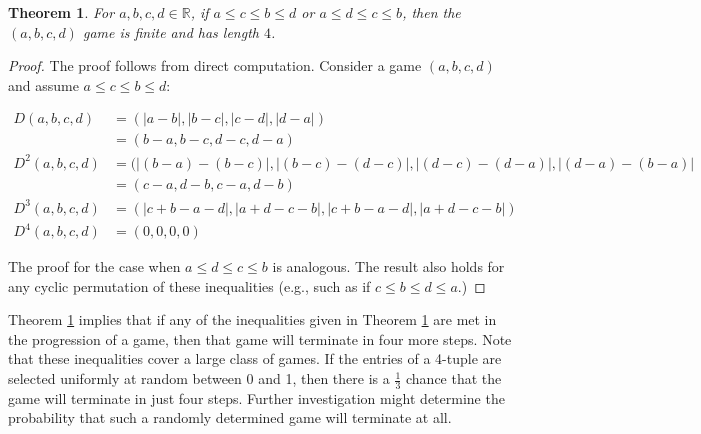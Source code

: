 \documentclass[12pt]{amsart}
\newtheorem{theorem}{Theorem}[section]
\newcommand{\diff}{D}
\begin{document}
\begin{theorem}
\label{thm:inequalities}
For $a,b,c,d\in \mathbb{R}$, if $a \leq c \leq b \leq d$ or $a \leq d \leq c \leq b$, then the $(a,b,c,d)$ game is finite and has length $4$. 
\end{theorem}

\begin{proof}

The proof follows from direct computation. Consider a game $(a,b,c,d)$ and assume $a \leq c \leq b \leq d$:

\begin{align*}
\diff(a, b, c, d) &= (|a-b|, |b-c|, |c-d|, |d-a|) \\
&=(b-a, b-c, d-c, d-a)\\
\diff^2(a, b, c, d) &= (|(b-a) - (b-c)|, |(b-c) - (d-c)|, |(d-c) - (d-a)|, |(d-a) - (b-a)| \\
&= (c-a, d-b, c-a, d-b)\\
\diff^3(a, b, c, d) &= (|c + b - a - d|, |a + d - c - b|, |c + b - a - d|, |a + d - c - b|)\\
\diff^4(a, b, c, d) &= (0,0,0,0)
\end{align*}

The proof for the case when $a \leq d \leq c \leq b$ is analogous. The result also holds for any cyclic permutation of these inequalities (e.g., such as if $c \leq b \leq d \leq a$.)
\end{proof}

Theorem \ref{thm:inequalities} implies that if any of the inequalities given in Theorem \ref{thm:inequalities} are met in the progression of a game, then that game will terminate in four more steps. Note that these inequalities cover a large class of games. If the entries of a 4-tuple are selected uniformly at random between 0 and 1, then there is a $\frac{1}{3}$ chance that the game will terminate in just four steps. Further investigation might determine the probability that such a randomly determined game will terminate at all.
\end{document}
